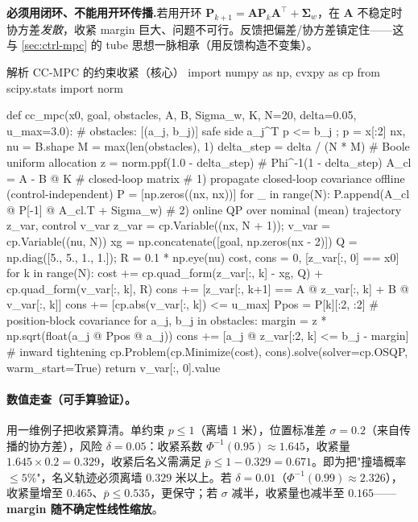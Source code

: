 \begin{note}
\textbf{必须用闭环、不能用开环传播.}\;若用开环 $\mathbf{P}_{k+1}=\mathbf{A}\mathbf{P}_k\mathbf{A}^\top+\boldsymbol{\Sigma}_w$，在 $\mathbf{A}$ 不稳定时协方差\emph{发散}，收紧 margin 巨大、问题不可行。反馈把偏差/协方差镇定住——这与 \cref{sec:ctrl-mpc} 的 tube 思想一脉相承（用反馈构造不变集）。
\end{note}

\begin{codebox}[Python]{解析 CC-MPC 的约束收紧（核心）}
import numpy as np, cvxpy as cp
from scipy.stats import norm

def cc_mpc(x0, goal, obstacles, A, B, Sigma_w, K, N=20,
           delta=0.05, u_max=3.0):
    # obstacles: [(a_j, b_j)] safe side a_j^T p <= b_j ; p = x[:2]
    nx, nu = B.shape
    M = max(len(obstacles), 1)
    delta_step = delta / (N * M)            # Boole uniform allocation
    z = norm.ppf(1.0 - delta_step)          # Phi^{-1}(1 - delta_step)
    A_cl = A - B @ K                        # closed-loop matrix
    # 1) propagate closed-loop covariance offline (control-independent)
    P = [np.zeros((nx, nx))]
    for _ in range(N):
        P.append(A_cl @ P[-1] @ A_cl.T + Sigma_w)
    # 2) online QP over nominal (mean) trajectory z_var, control v_var
    z_var = cp.Variable((nx, N + 1)); v_var = cp.Variable((nu, N))
    xg = np.concatenate([goal, np.zeros(nx - 2)])
    Q = np.diag([5., 5., 1., 1.]); R = 0.1 * np.eye(nu)
    cost, cons = 0, [z_var[:, 0] == x0]
    for k in range(N):
        cost += cp.quad_form(z_var[:, k] - xg, Q) + cp.quad_form(v_var[:, k], R)
        cons += [z_var[:, k+1] == A @ z_var[:, k] + B @ v_var[:, k]]
        cons += [cp.abs(v_var[:, k]) <= u_max]
        Ppos = P[k][:2, :2]                 # position-block covariance
        for a_j, b_j in obstacles:
            margin = z * np.sqrt(float(a_j @ Ppos @ a_j))
            cons += [a_j @ z_var[:2, k] <= b_j - margin]   # inward tightening
    cp.Problem(cp.Minimize(cost), cons).solve(solver=cp.OSQP, warm_start=True)
    return v_var[:, 0].value
\end{codebox}

\paragraph{数值走查（可手算验证）。}
用一维例子把收紧算清。单约束 $p\le1$（离墙 1 米），位置标准差 $\sigma=0.2$（来自传播的协方差），风险 $\delta=0.05$：收紧系数 $\Phi^{-1}(0.95)\approx1.645$，收紧量 $1.645\times0.2=0.329$，收紧后名义需满足 $\bar p\le1-0.329=0.671$。即为把"撞墙概率 $\le5\%$"，名义轨迹必须离墙 $0.329$ 米以上。若 $\delta=0.01$（$\Phi^{-1}(0.99)\approx2.326$），收紧量增至 $0.465$、$\bar p\le0.535$，更保守；若 $\sigma$ 减半，收紧量也减半至 $0.165$——\textbf{margin 随不确定性线性缩放}。

